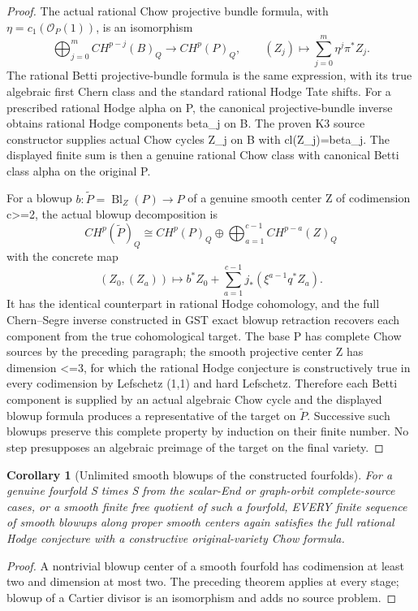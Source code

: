 \documentclass[11pt]{article}
\newtheorem{corollary}[theorem]{Corollary}
\begin{document}
\begin{proof}
The actual rational Chow projective
bundle formula, with
\(\eta=c_1(\mathcal O_P(1))\),
is an isomorphism
\[
 \bigoplus_{j=0}^{m}CH^{p-j}(B)_Q
   \longrightarrow CH^p(P)_Q,\qquad
 (Z_j)\longmapsto\sum_{j=0}^{m}
                 \eta^j\pi^*Z_j .
\]
The rational Betti projective-bundle
formula is the same expression,
with its true algebraic first Chern
class and the standard rational
Hodge Tate shifts. For a prescribed
rational Hodge alpha on P, the
canonical projective-bundle inverse
obtains rational Hodge components
beta_j on B. The proven K3 source
constructor supplies actual Chow
cycles Z_j on B with
cl(Z_j)=beta_j. The displayed
finite sum is then a genuine
rational Chow class with
canonical Betti class alpha
on the original P.

For a blowup \(b:\widetilde P=
\operatorname{Bl}_Z(P)\to P\)
of a genuine smooth center Z
of codimension c>=2, the actual
blowup decomposition is
\[
 CH^p(\widetilde P)_Q
 \cong CH^p(P)_Q\oplus
       \bigoplus_{a=1}^{c-1}
                 CH^{p-a}(Z)_Q
\]
with the concrete map
\[
 (Z_0,(Z_a))\longmapsto
 b^*Z_0+\sum_{a=1}^{c-1}
 j_*(\xi^{a-1}q^*Z_a).
\]
It has the identical counterpart in
rational Hodge cohomology, and
the full Chern--Segre inverse
constructed in GST exact blowup
retraction recovers each
component from the true
cohomological target. The base
P has complete Chow sources by
the preceding paragraph; the
smooth projective center Z has
dimension <=3, for which the
rational Hodge conjecture is
constructively true in every
codimension by Lefschetz (1,1)
and hard Lefschetz. Therefore
each Betti component is supplied
by an actual algebraic Chow
cycle and the displayed blowup
formula produces a representative
of the target on \(\widetilde P\).
Successive such blowups preserve
this complete property by
induction on their finite number.
No step presupposes an algebraic
preimage of the target on the
final variety.
\end{proof}

\begin{corollary}[Unlimited smooth blowups of the constructed fourfolds]
For a genuine fourfold S times S
from the scalar-End or graph-orbit
complete-source cases, or a smooth
finite free quotient of such a
fourfold, EVERY finite sequence
of smooth blowups along proper
smooth centers again satisfies
the full rational Hodge
conjecture with a constructive
original-variety Chow formula.
\end{corollary}
\begin{proof}
A nontrivial blowup center of a
smooth fourfold has codimension
at least two and dimension at most
two. The preceding theorem applies
at every stage; blowup of a Cartier
divisor is an isomorphism and adds
no source problem.
\end{proof}
\end{document}
